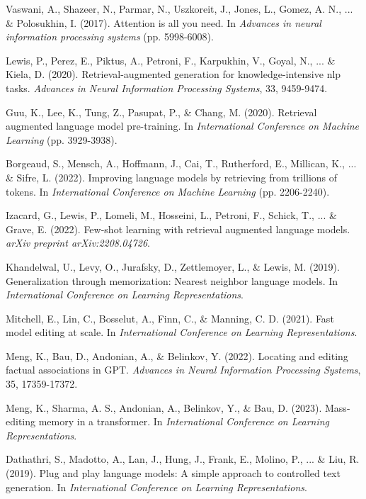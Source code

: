 \documentclass[11pt, a4paper]{article}
\theoremstyle{definition}
\begin{document}
\begin{thebibliography}{99}

Vaswani, A., Shazeer, N., Parmar, N., Uszkoreit, J., Jones, L., Gomez, A. N., ... \& Polosukhin, I. (2017). 
Attention is all you need. 
In \textit{Advances in neural information processing systems} (pp. 5998-6008).

Lewis, P., Perez, E., Piktus, A., Petroni, F., Karpukhin, V., Goyal, N., ... \& Kiela, D. (2020). 
Retrieval-augmented generation for knowledge-intensive nlp tasks. 
\textit{Advances in Neural Information Processing Systems}, 33, 9459-9474.

Guu, K., Lee, K., Tung, Z., Pasupat, P., \& Chang, M. (2020). 
Retrieval augmented language model pre-training. 
In \textit{International Conference on Machine Learning} (pp. 3929-3938).

Borgeaud, S., Mensch, A., Hoffmann, J., Cai, T., Rutherford, E., Millican, K., ... \& Sifre, L. (2022). 
Improving language models by retrieving from trillions of tokens. 
In \textit{International Conference on Machine Learning} (pp. 2206-2240).

Izacard, G., Lewis, P., Lomeli, M., Hosseini, L., Petroni, F., Schick, T., ... \& Grave, E. (2022). 
Few-shot learning with retrieval augmented language models. 
\textit{arXiv preprint arXiv:2208.04726}.

Khandelwal, U., Levy, O., Jurafsky, D., Zettlemoyer, L., \& Lewis, M. (2019). 
Generalization through memorization: Nearest neighbor language models. 
In \textit{International Conference on Learning Representations}.

Mitchell, E., Lin, C., Bosselut, A., Finn, C., \& Manning, C. D. (2021). 
Fast model editing at scale. 
In \textit{International Conference on Learning Representations}.

Meng, K., Bau, D., Andonian, A., \& Belinkov, Y. (2022). 
Locating and editing factual associations in GPT. 
\textit{Advances in Neural Information Processing Systems}, 35, 17359-17372.

Meng, K., Sharma, A. S., Andonian, A., Belinkov, Y., \& Bau, D. (2023). 
Mass-editing memory in a transformer. 
In \textit{International Conference on Learning Representations}.

Dathathri, S., Madotto, A., Lan, J., Hung, J., Frank, E., Molino, P., ... \& Liu, R. (2019). 
Plug and play language models: A simple approach to controlled text generation. 
In \textit{International Conference on Learning Representations}.


\end{thebibliography}
\end{document}
